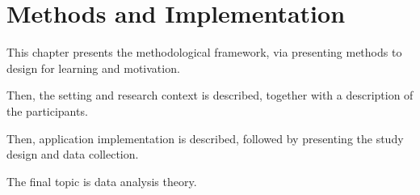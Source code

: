 \chapter{Methods and Implementation}\label{cha:Method}





This chapter presents the methodological framework, via presenting methods to design for learning and motivation.

Then, the setting and research context is described, together with a description of the participants.

Then, application implementation is described, followed by presenting the study design and data collection.

The final topic is data analysis theory.












